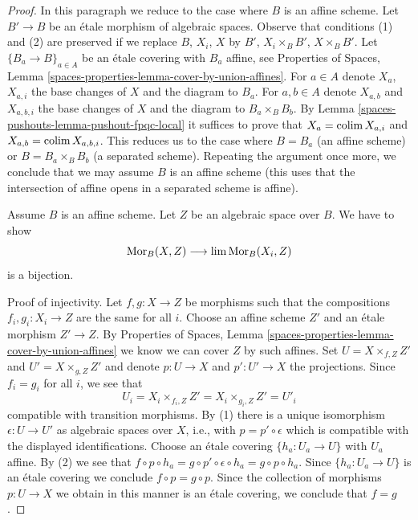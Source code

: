 \begin{proof}
In this paragraph we reduce to the case where $B$ is an affine scheme.
Let $B' \to B$ be an \'etale morphism of algebraic spaces.
Observe that conditions (1) and (2) are preserved if we replace
$B$, $X_i$, $X$ by $B'$, $X_i \times_B B'$, $X \times_B B'$.
Let $\{B_a \to B\}_{a \in A}$ be an \'etale covering with $B_a$
affine, see Properties of Spaces, Lemma
\ref{spaces-properties-lemma-cover-by-union-affines}.
For $a \in A$ denote $X_a$, $X_{a, i}$ the base changes of $X$ and the
diagram to $B_a$. For $a, b \in A$ denote
$X_{a, b}$ and $X_{a, b, i}$ the base changes of $X$ and the
diagram to $B_a \times_B B_b$.
By Lemma \ref{spaces-pushouts-lemma-pushout-fpqc-local}
it suffices to prove that $X_a = \operatorname{colim} X_{a, i}$ and
$X_{a, b} = \operatorname{colim} X_{a, b, i}$.
This reduces us to the case where $B = B_a$ (an affine scheme) or
$B = B_a \times_B B_b$ (a separated scheme). Repeating the
argument once more, we conclude that we may assume $B$ is
an affine scheme (this uses that the intersection of affine
opens in a separated scheme is affine).

\medskip\noindent
Assume $B$ is an affine scheme. Let $Z$ be an algebraic space over $B$.
We have to show
$$
\operatorname{Mor}_B(X, Z) \longrightarrow \lim \operatorname{Mor}_B(X_i, Z)
$$
is a bijection.

\medskip\noindent
Proof of injectivity. Let $f, g : X \to Z$ be morphisms
such that the compositions $f_i, g_i : X_i \to Z$ are the same for all $i$.
Choose an affine scheme $Z'$ and an \'etale morphism $Z' \to Z$. By
Properties of Spaces, Lemma \ref{spaces-properties-lemma-cover-by-union-affines}
we know we can cover $Z$ by such affines. Set $U = X \times_{f, Z} Z'$
and $U' = X \times_{g, Z} Z'$ and denote $p : U \to X$ and $p' : U' \to X$
the projections. Since $f_i = g_i$ for all $i$, we see that
$$
U_i = X_i \times_{f_i, Z} Z' = X_i \times_{g_i, Z} Z' = U'_i
$$
compatible with transition morphisms. By (1) there is a unique isomorphism
$\epsilon : U \to U'$ as algebraic spaces over $X$, i.e., with
$p = p' \circ \epsilon$ which is compatible with
the displayed identifications. Choose an \'etale covering
$\{h_a : U_a \to U\}$ with $U_a$ affine.
By (2) we see that $f \circ p \circ h_a = g \circ p' \circ \epsilon \circ h_a =
g \circ p \circ h_a$. Since $\{h_a : U_a \to U\}$ is an \'etale covering
we conclude $f \circ p = g \circ p$.
Since the collection of morphisms $p : U \to X$ we obtain
in this manner is an \'etale covering, we conclude that $f = g$.


\end{proof}

